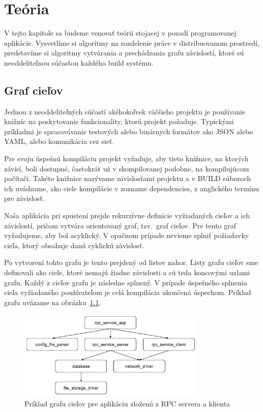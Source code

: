 \chapter{Te\'{o}ria}
\label{ch:theory}

V tejto kapitole sa budeme venovať teórii stojacej v pozadí programovanej aplikácie.
Vysvetlíme si algoritmy na rozdelenie práce v distribuovanom prostredí, predstavíme
si algoritmy vytvárania a prechádzania grafu závislostí, ktoré sú neoddeliteľnou
súčasťou každého build systému.

\section{Graf cie\v{l}ov}
\label{sec:depgraph}

Jednou z neoddeliteľných súčastí akéhokoľvek väčšieho projektu je používanie knižníc
na poskytovanie funkcionality, ktorú projekt požaduje. Typickými príkladmi je spracovávanie
testových alebo binárnych formátov ako JSON alebo YAML, alebo komunikácia cez sieť.

Pre svoju úspešnú kompiláciu projekt vyžaduje, aby tieto knižnice, na ktorých závisí,
boli dostupné, častokrát už v skompilovanej podobne, na kompilujúcom počítači. Takéto
knižnice nazývame závislosťami projektu a v BUILD súboroch ich uvádzame, ako ciele
kompilácie v zozname dependencies, z anglického termínu pre závislosť.

Naša aplikácia pri spustení prejde rekurzívne definície vyžiadaných cieľov a ich závislostí,
pričom vytvára orientovaný graf, tzv.\ graf cieľov. Pre tento graf vyžadujeme, aby bol
acyklický. V opačnom prípade nevieme splniť požiadavky cieľa, ktorý obsahuje danú
cyklickú závislosť.

Po vytvorení tohto grafu je tento prejdený od listov nahor. Listy grafu cieľov
sme definovali ako ciele, ktoré nemajú žiadne závislosti a sú teda koncovými uzlami
grafu. Každý z cieľov grafu je následne splnený. V prípade úspešného splnenia cieľa vyžiadaného
používateľom je celá kompilácia ukončená úspechom. Príklad grafu uvázame na obrázku~\ref{img:depgraphtheory}.

\begin{figure}[h]
  \centerline{\includegraphics[width=0.8\textwidth]{images/dependency_targets}}
  \caption[Graf cieľov]{Príklad grafu cieľov pre aplikáciu zloženú z RPC servera a klienta}
  \label{img:depgraphtheory}
\end{figure}

